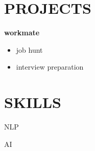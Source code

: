 \documentclass[a4paper,10pt]{article}
\begin{document}
\section*{PROJECTS}

\textbf{ workmate  }\\[-0.3em]
\begin{itemize}[leftmargin=1em, noitemsep, topsep=0pt, partopsep=0pt, parsep=0pt]

    \item job hunt

    \item interview preparation

\end{itemize}\vspace{0.3em} %


\section*{SKILLS}

NLP

AI
\end{document}
